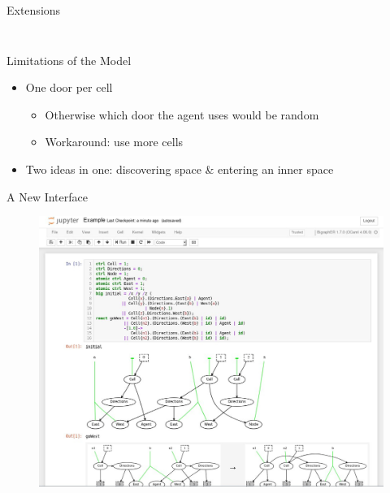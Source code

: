 \documentclass{beamer}
\begin{document}
\begin{frame}{Extensions}
\begin{columns}
\begin{column}{0.5\textwidth}
\begin{figure}
      \end{figure}
    \end{column}
  \end{columns}
  \pause
\end{frame}

\begin{frame}{Limitations of the Model}
  \begin{itemize}
  \item One door per cell
    \begin{itemize}
    \item Otherwise which door the agent uses would be random
    \item Workaround: use more cells
    \end{itemize}
  \item Two ideas in one: discovering space \& entering an inner space
  \end{itemize}
\end{frame}

\begin{frame}{A New Interface}
  \begin{figure}
    \centering
    \includegraphics{screenshot.jpg}
  \end{figure}
\end{frame}
\end{document}

